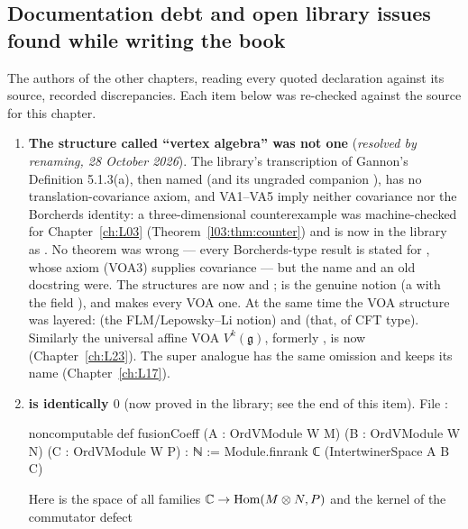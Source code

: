 \subsection{Documentation debt and open library issues found while writing the book}\label{ch15:sec:debt}

The authors of the other chapters, reading every quoted declaration against its source, recorded
discrepancies. Each item below was re-checked against the source for this chapter.
\begin{enumerate}
\item \textbf{The structure called ``vertex algebra'' was not one} (\emph{resolved by renaming, 28 October 2026}). The
  library's transcription of Gannon's Definition 5.1.3(a), then named  (and its ungraded companion
  ), has no translation-covariance axiom, and VA1--VA5 imply neither covariance nor the Borcherds identity:
  a three-dimensional counterexample was machine-checked for Chapter~\ref{ch:L03} (Theorem~\ref{l03:thm:counter}) and is
  now in the library as . No theorem was wrong --- every Borcherds-type result
  is stated for , whose axiom (VOA3) supplies covariance --- but the name and an old
  docstring were. The structures are now  and ;  is the
  genuine notion (a  with the field ), and
   makes every VOA one. At the same time the VOA structure was layered:
   (the FLM/Lepowsky--Li notion) and  (that, of CFT type).
  Similarly the universal affine VOA $V^k(\mathfrak g)$, formerly , is now 
  (Chapter~\ref{ch:L23}). The super analogue  has the same omission and keeps its name
  (Chapter~\ref{ch:L17}).
\item \textbf{ is identically $0$} (now proved in the library; see the end of this item). File
  :
\begin{leancode}
noncomputable def fusionCoeff (A : OrdVModule W M) (B : OrdVModule W N) (C : OrdVModule W P) : ℕ :=
  Module.finrank ℂ (IntertwinerSpace A B C)
\end{leancode}
  Here  is the space of all families ${\mathbb{C}}\to\mathrm{Hom}(M\otimes N,P)$
  and  the kernel of the commutator defect

\end{enumerate}
